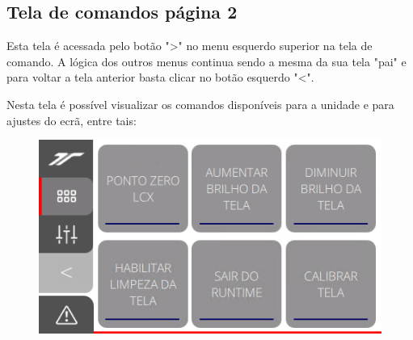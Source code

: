 \newpage
\thispagestyle{fancy}
\vspace*{40 pt}
\subsection{Tela de comandos página 2}\label{ihmAlimentacaoTelaComandosPagina2}

Esta tela é acessada pelo botão "\textgreater" no menu esquerdo superior na tela de comando. A lógica dos outros menus continua sendo a mesma da sua tela "pai" e para voltar a tela anterior basta clicar no botão esquerdo "\textless{}".

Nesta tela é possível visualizar os comandos disponíveis para a unidade e para ajustes do ecrã, entre tais:




    

\vspace*{\fill}
\begin{figure}[h]
  \centering
  \includegraphics{src/imagesFlexo/11-IHMALM/e-3.png}
\end{figure}
\vspace*{\fill}

